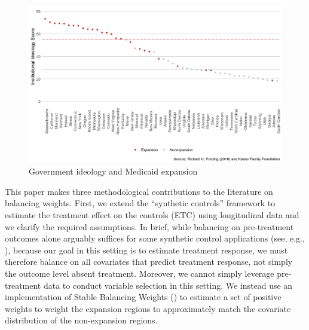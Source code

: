 \documentclass[aoas]{imsart}
\theoremstyle{plain}
\theoremstyle{remark}
\begin{document}
\begin{figure}[H]
    \begin{center}
    \caption{Government ideology and Medicaid expansion}
    \label{fig:stateideology}
    \includegraphics[scale=0.5]{01_Plots/political-expansion-plot.png}
    \end{center}
\end{figure}

This paper makes three methodological contributions to the literature on balancing weights. First, we extend the ``synthetic controls'' framework to estimate the treatment effect on the controls (ETC) using longitudinal data and we clarify the required assumptions. In brief, while balancing on pre-treatment outcomes alone arguably suffices for some synthetic control applications (see, e.g., \cite{botosaru2017role}), because our goal in this setting is to estimate treatment response, we must therefore balance on all covariates that predict treatment response, not simply the outcome level absent treatment. Moreover, we cannot simply leverage pre-treatment data to conduct variable selection in this setting. We instead use an implementation of Stable Balancing Weights (\cite{zubizarreta2015stable}) to estimate a set of positive weights to weight the expansion regions to approximately match the covariate distribution of the non-expansion regions. 
\end{document}
